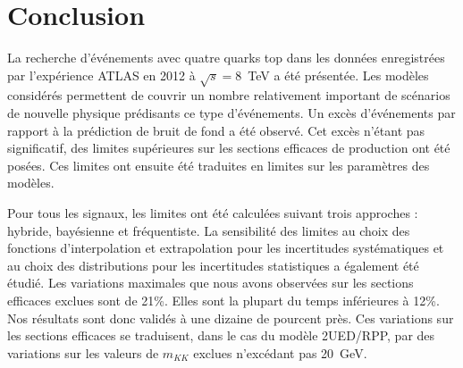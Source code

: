\section{Conclusion}

La recherche d'\'ev\'enements avec quatre quarks top dans les donn\'ees enregistr\'ees par l'exp\'erience ATLAS en 2012 \`a $\sqrt{s}=8$~TeV a \'et\'e pr\'esent\'ee. Les mod\`eles consid\'er\'es permettent de couvrir un nombre relativement important de sc\'enarios de nouvelle physique pr\'edisants ce type d'\'ev\'enements. Un exc\`es d'\'ev\'enements par rapport \`a la pr\'ediction de bruit de fond a \'et\'e observ\'e. Cet exc\`es n'\'etant pas significatif, des limites sup\'erieures sur les sections efficaces de production ont \'et\'e pos\'ees. Ces limites ont ensuite \'et\'e traduites en limites sur les param\`etres des mod\`eles. 

Pour tous les signaux, les limites ont \'et\'e calcul\'ees suivant trois approches : hybride, bay\'esienne et fr\'equentiste. La sensibilit\'e des limites au choix des fonctions d'interpolation et extrapolation pour les incertitudes syst\'ematiques et au choix des distributions \prior{} pour les incertitudes statistiques a \'egalement \'et\'e \'etudi\'e. Les variations maximales que nous avons observ\'ees sur les sections efficaces exclues sont de 21\%. Elles sont la plupart du temps inf\'erieures \`a 12\%. Nos r\'esultats sont donc valid\'es \`a une dizaine de pourcent pr\`es. Ces variations sur les sections efficaces se traduisent, dans le cas du mod\`ele 2UED/RPP, par des variations sur les valeurs de $m_{KK}$ exclues n'exc\'edant pas 20~GeV.   
